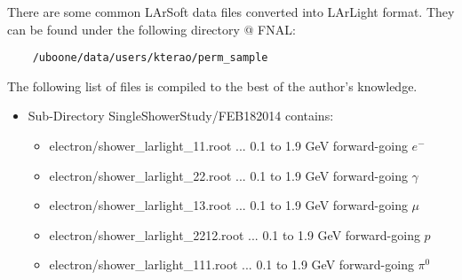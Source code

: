 
There are some common LArSoft data files converted into LArLight format.
They can be found under the following directory @ FNAL:
\begin{lstlisting}
    /uboone/data/users/kterao/perm_sample
\end{lstlisting}
The following list of files is compiled to the best of the author's knowledge.
\begin{itemize}
  \item Sub-Directory {\ttfamily SingleShowerStudy/FEB182014} contains:
  \begin{itemize}
    \item {\ttfamily electron/shower\_larlight\_11.root} ... 0.1 to 1.9 GeV forward-going $e^-$ 
    \item {\ttfamily electron/shower\_larlight\_22.root} ... 0.1 to 1.9 GeV forward-going $\gamma$ 
    \item {\ttfamily electron/shower\_larlight\_13.root} ... 0.1 to 1.9 GeV forward-going $\mu$ 
    \item {\ttfamily electron/shower\_larlight\_2212.root} ... 0.1 to 1.9 GeV forward-going $p$ 
    \item {\ttfamily electron/shower\_larlight\_111.root} ... 0.1 to 1.9 GeV forward-going $\pi^0$ 
  \end{itemize}
\end{itemize}
